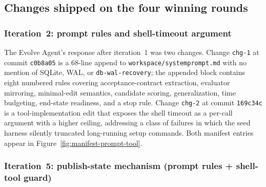 \subsection{Changes shipped on the four winning rounds}
\label{app:case-study:changes}

\subsubsection{Iteration~2: prompt rules and shell-timeout argument}
\label{app:case-study:changes:iter2}

The Evolve Agent's response after iteration~1 was two changes. Change \texttt{chg-1} at commit \texttt{c0b8a05} is a 68-line append to \texttt{workspace/systemprompt.md} with no mention of SQLite, WAL, or \texttt{db-wal-recovery}; the appended block contains eight numbered rules covering acceptance-contract extraction, evaluator mirroring, minimal-edit semantics, candidate scoring, generalization, time budgeting, end-state readiness, and a stop rule. Change \texttt{chg-2} at commit \texttt{169c34c} is a tool-implementation edit that exposes the shell timeout as a per-call argument with a higher ceiling, addressing a class of failures in which the seed harness silently truncated long-running setup commands. Both manifest entries appear in Figure~\ref{fig:manifest-prompt-tool}.


\FloatBarrier

\subsubsection{Iteration~5: publish-state mechanism (prompt rules + shell-tool guard)}
\label{app:case-study:changes:iter5}

